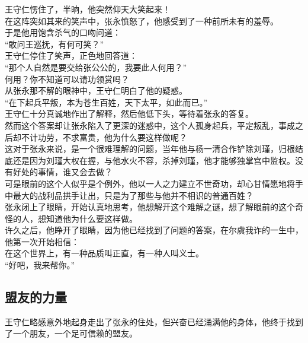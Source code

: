 \begin{multicols}{\theparacolNo}
王守仁愣住了，半晌，他突然仰天大笑起来！\\

在这阵突如其来的笑声中，张永愤怒了，他感受到了一种前所未有的羞辱。\\

于是他用饱含杀气的口吻问道：\\

“敢问王巡抚，有何可笑？”\\

王守仁停住了笑声，正色地回答道：\\

“那个人自然是要交给张公公的，我要此人何用？”\\

何用？你不知道可以请功领赏吗？\\

从张永那不解的眼神中，王守仁明白了他的疑惑。\\

“在下起兵平叛，本为苍生百姓，天下太平，如此而已。”\\

王守仁十分真诚地作出了解释，然后他低下头，等待着张永的答复。\\

然而这个答案却让张永陷入了更深的迷惑中，这个人孤身起兵，平定叛乱，事成之后却不计功劳，不求富贵，他为什么要这样做呢？\\

这对于张永来说，是一个很难理解的问题，当年他与杨一清合作铲除刘瑾，归根结底还是因为刘瑾大权在握，与他水火不容，杀掉刘瑾，他才能够独掌宫中监权。没有好处的事情，谁又会去做？\\

可是眼前的这个人似乎是个例外，他以一人之力建立不世奇功，却心甘情愿地将手中最大的战利品拱手让出，只是为了那些与他并不相识的普通百姓？\\

张永闭上了眼睛，开始认真地思考，他想解开这个难解之谜，想了解眼前的这个奇怪的人，想知道他为什么要这样做。\\

许久之后，他睁开了眼睛，因为他已经找到了问题的答案，在尔虞我诈的一生中，他第一次开始相信：\\

在这个世界上，有一种品质叫正直，有一种人叫义士。\\

“好吧，我来帮你。”\\

\subsection{盟友的力量}
王守仁略感意外地起身走出了张永的住处，但兴奋已经涌满他的身体，他终于找到了一个朋友，一个足可信赖的盟友。\\


\end{multicols}
